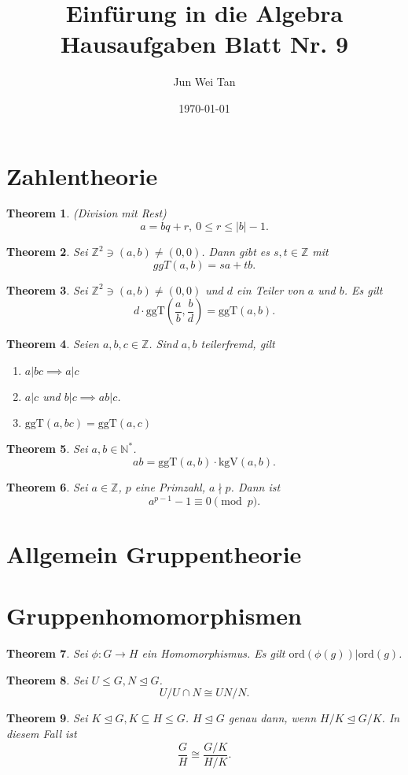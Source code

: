 \documentclass[prb,12pt]{revtex4-2}
\newtheorem{Theorem}{Theorem}
\theoremstyle{definition}
\theoremstyle{definition}
\newenvironment{parts}{\begin{enumerate}[label=(\alph*)]}{\end{enumerate}}
\newcommand{\N}{\mathbb{N}}
\newcommand{\Z}{\mathbb{Z}}
\begin{document}
	\title{Einf\"{u}rung in die Algebra Hausaufgaben Blatt Nr. 9}
	\author{Jun Wei Tan}
	\date{\today}
	\maketitle
	\section{Zahlentheorie}
	\begin{Theorem}
		(Division mit Rest)
	\[
	a=bq+r,~0\le r\le |b|-1
	.\] 
\end{Theorem}
\begin{Theorem}
	Sei $\Z^2\ni (a,b)\neq (0,0)$. Dann gibt es $s,t\in \Z$ mit
	\[
	ggT(a,b)=sa+tb
	.\] 
\end{Theorem}
\begin{Theorem}
	Sei $\Z^2\ni (a,b)\neq (0,0)$ und $d$ ein Teiler von $a$ und $b$. Es gilt
	\[
		d\cdot \text{ggT}\left( \frac{a}{b},\frac{b}{d} \right) =\text{ggT}(a,b)
	.\] 
\end{Theorem}
\begin{Theorem}
	Seien $a,b,c\in \Z$. Sind $a,b$ teilerfremd, gilt
	\begin{parts}
		\item $a|bc\implies a|c$ 
		\item $a|c$ und $b|c\implies ab|c$.
		\item $\text{ggT}(a,bc)=\text{ggT}(a,c)$
	\end{parts}
\end{Theorem}
\begin{Theorem}
	Sei $a,b\in \N^*$.
	\[
		ab=\text{ggT}(a,b)\cdot \text{kgV}(a,b)
	.\] 
\end{Theorem}
\begin{Theorem}
	 Sei $a\in \Z$, $p$ eine Primzahl, $a\nmid p$. Dann ist
	 \[
		 a^{p-1}-1\equiv 0\pmod{p}
	 .\] 
\end{Theorem}
	\section{Allgemein Gruppentheorie}
	\section{Gruppenhomomorphismen}
	\begin{Theorem}
		Sei $\phi:G\to H$ ein Homomorphismus. Es gilt $\text{ord}(\phi(g))|\text{ord}(g)$.
	\end{Theorem}
	\begin{Theorem}
		Sei $U\le G,N\trianglelefteq G$. 
		\[
		U / U\cap N \cong UN / N
		.\] 
	\end{Theorem}
	\begin{Theorem}
		Sei $K\trianglelefteq G, K\subseteq H\le G$. $H\trianglelefteq G$ genau dann, wenn $H / K \trianglelefteq G / K$. In diesem Fall ist
		\[
		\frac{G}{H}\cong \frac{G / K}{H / K}
		.\] 
	\end{Theorem}
\end{document}
